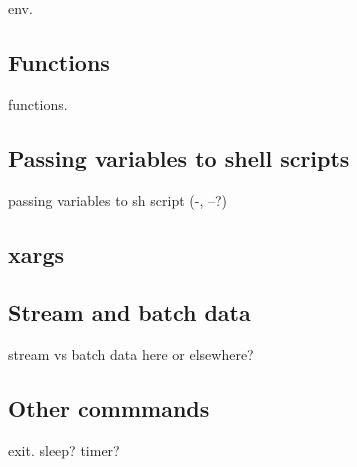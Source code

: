 env. 

\subsection{Functions}

functions.

\subsection{Passing variables to shell scripts}

passing variables to sh script (-, --?)

\subsection{xargs}

\subsection{Stream and batch data}
stream vs batch data here or elsewhere?

\subsection{Other commmands}
exit.
sleep?
timer?
